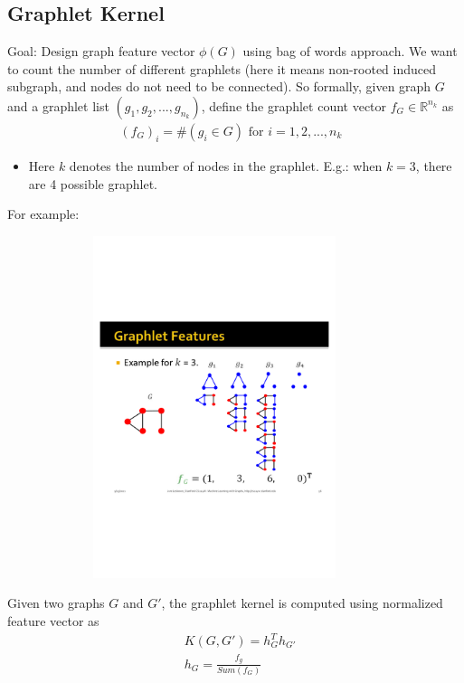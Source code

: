 \subsection{Graphlet Kernel}
Goal: Design graph feature vector $\phi(G)$ using bag of words approach. We want to count the number of different graphlets (here it means non-rooted induced subgraph, and nodes do not need to be connected). So formally, given graph $G$ and a graphlet list $(g_1, g_2, ..., g_{n_k})$, define the graphlet count vector $f_G\in \mathbb{R}^{n_k}$ as 
    \begin{align*}
        (f_G)_i = \#(g_i \in G) \textrm{ for $i=1,2,...,n_k$ }
    \end{align*}
    \begin{itemize}
        \item Here $k$ denotes the number of nodes in the graphlet. E.g.: when $k=3$, there are 4 possible graphlet. 
    \end{itemize}
For example: 
    \begin{figure}[H]
    \includegraphics[width=10cm, height=10cm]{images/002_graphlet_kernel.png}
    \end{figure}
Given two graphs $G$ and $G'$, the graphlet kernel is computed using normalized feature vector as 
    \begin{align*}
        &K(G,G') = h_G^T h_{G'}\\
        &h_G = \frac{f_g}{Sum(f_G)}
    \end{align*}

